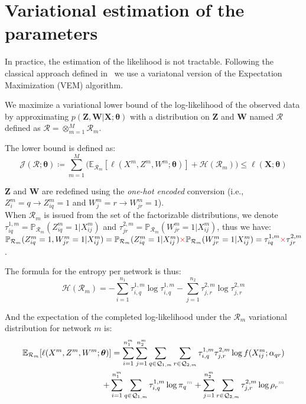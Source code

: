 \documentclass[12pt,a4paper]{report}
\begin{document}
\section{Variational estimation of the parameters}\label{sec:variational-estimation-of-the-parameters}

In practice, the estimation of the likelihood is not tractable. Following the
classical approach defined in~\cite{daudinMixtureModelRandom2008}
we use a variatonal version of the Expectation Maximization (VEM) algorithm.

We maximize a variational lower bound of the log-likelihood of the observed data
by approximating $p(\bm{Z,W}|\bm{X};\bm{\theta})$ with a distribution on $\bm{Z}$
and $\bm{W}$ named $\mathcal{R}$ defined as
$\mathcal{R} = \otimes_{m=1}^M \mathcal{R}_m$.\

The lower bound is defined as:
\begin{equation*}
    \mathcal{J}(\mathcal{R};\bm{\theta}) \coloneqq \sum_{m=1}^{M} \bigg( \mathbb{E}_{\mathcal{R}_m}[\ell(X^m,Z^m,W^m;\bm{\theta})] + \mathcal{H}(\mathcal{R}_m) \bigg)  \leq \ell(\bm{X};\bm{\theta})
\end{equation*}

$\bm{Z}$ and $\bm{W}$ are
redefined using the \emph{one-hot encoded} conversion (i.e., $Z_i^m = q
\rightarrow Z_{iq}^m = 1$ and $W_j^m = r \rightarrow W_{jr}^m = 1$).\\ %

When $\mathcal{R}_m$ is issued from the set of the factorizable distributions,
we denote
$\tau_{iq}^{1,m} = \mathbb{P}_{\mathcal{R}_m}(Z_{iq}^m = 1|X_{ij}^m)$
and $\tau_{jr}^{2,m} = \mathbb{P}_{\mathcal{R}_m}(W_{jr}^m = 1|X_{ij}^m)$, thus
we have:
$\mathbb{P}_{\mathcal{R}_m} (Z_{iq}^m = 1, W_{jr}^m = 1|X_{ij}^m) =
\mathbb{P}_{\mathcal{R}_m}(Z_{iq}^m = 1|X_{ij}^m) {\color{red}\times} \mathbb{P}_{\mathcal{R}_m}(W_{jr}^m = 1|X_{ij}^m) = \tau_{iq}^{1,m} {\color{red}\times} \tau_{jr}^{2,m}$.


The formula for the entropy per network is thus:
\begin{equation*}
    \mathcal{H}(\mathcal{R}_m) = - \sum_{i=1}^{n_1} \tau^{1,m}_{i,q} \log \tau^{1,m}_{i,q} - \sum_{j=1}^{n_2} \tau^{2,m}_{j,r} \log \tau^{2,m}_{j,r}
\end{equation*}

And the expectation of the completed log-likelihood under the $\mathcal{R}_m$ variational distribution for network $m$ is:
\begin{align*}
    \mathbb{E}_{\mathcal{R}_m}[\ell(X^m,Z^m,W^m;\bm{\theta})] = \sum_{i = 1}^{n_1^m}\sum_{j=1}^{n_2^m}\sum_{q \in \mathcal{Q}_{1,m}} \sum_{r \in \mathcal{Q}_{2,m}} \tau^{1,m}_{i,q} \tau^{2,m}_{j,r} \log f(X^{m}_{ij}; \alpha_{qr}) \\
        + \sum_{i=1}^{n_1^m} \sum_{q \in \mathcal{Q}_{1,m}} \tau^{1,m}_{i,q} \log \pi_{\color{black}q}^{\color{gray}m} + \sum_{j=1}^{n_2^m} \sum_{r \in \mathcal{Q}_{2,m}} \tau^{2,m}_{j,r} \log \rho_{\color{black}r}^{\color{gray}m}
\end{align*}
\end{document}
